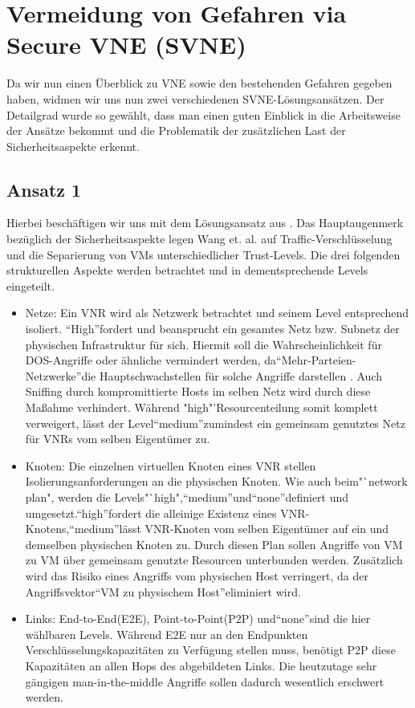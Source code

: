 \documentclass{lni}
\begin{document}
\section{Vermeidung von Gefahren via Secure VNE (SVNE)}
\label{sec:svne}
Da wir nun einen Überblick zu VNE sowie den bestehenden Gefahren gegeben haben, widmen wir uns nun zwei verschiedenen SVNE-Lösungsansätzen. Der Detailgrad wurde so gewählt, dass man einen guten Einblick in die Arbeitsweise der Ansätze bekommt und die Problematik der zusätzlichen Last der Sicherheitsaspekte erkennt.

\subsection{Ansatz 1}

Hierbei beschäftigen wir uns mit dem Lösungsansatz aus \cite{wang2016towards}. 
Das Hauptaugenmerk bezüglich der Sicherheitsaspekte legen Wang et. al. auf Traffic-Verschlüsselung und die Separierung von VMs unterschiedlicher Trust-Levels. Die drei folgenden strukturellen Aspekte werden betrachtet und in dementsprechende Levels eingeteilt.
\begin{itemize}
\item Netze:\newline
Ein VNR wird als Netzwerk betrachtet und seinem Level entsprechend isoliert. "`High"'fordert und beansprucht ein gesamtes Netz bzw. Subnetz der physischen Infrastruktur für sich. Hiermit soll die Wahrscheinlichkeit für DOS-Angriffe oder ähnliche vermindert werden, da"`Mehr-Parteien-Netzwerke"'die Hauptschwachstellen für solche Angriffe darstellen \cite{DOS}. Auch Sniffing durch kompromittierte Hosts im selben Netz wird durch diese Maßahme verhindert. Während "high"'Resourcenteilung somit komplett verweigert, lässt der Level"`medium"'zumindest ein gemeinsam genutztes Netz für VNRs vom selben Eigentümer zu.

\item Knoten:\newline
Die einzelnen virtuellen Knoten eines VNR stellen Isolierungsanforderungen an die physischen Knoten. Wie auch beim"`network plan", werden die Levels"`high","`medium"'und"`none"'definiert und umgesetzt."`high"'fordert die alleinige Existenz eines VNR-Knotens,"`medium"'lässt VNR-Knoten vom selben Eigentümer auf ein und demselben physischen Knoten zu. Durch diesen Plan sollen Angriffe von VM zu VM über gemeinsam genutzte Resourcen unterbunden werden. Zusätzlich wird das Risiko eines Angriffs vom physischen Host verringert, da der Angriffsvektor"`VM zu physischem Host"'eliminiert wird.

\item Links:\newline
End-to-End(E2E), Point-to-Point(P2P) und"`none"'sind die hier wählbaren Levels. Während E2E nur an den Endpunkten Verschlüsselungskapazitäten zu Verfügung stellen muss, benötigt P2P diese Kapazitäten an allen Hops des abgebildeten Links. Die heutzutage sehr gängigen man-in-the-middle Angriffe sollen dadurch wesentlich erschwert werden. 
\end{itemize}
\end{document}
